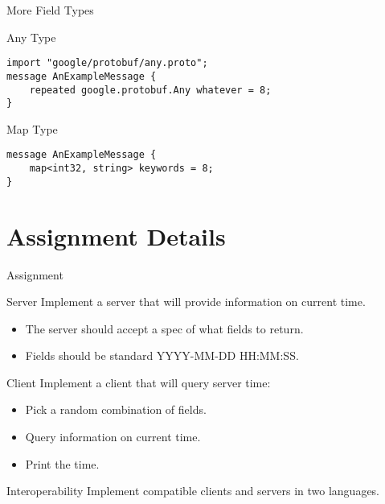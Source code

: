 \begin{frame}[fragile]{More Field Types}
    \begin{block}{Any Type}
\begin{lstlisting}[style=mini]
import "google/protobuf/any.proto";
message AnExampleMessage {
    repeated google.protobuf.Any whatever = 8;
}
\end{lstlisting}
    \end{block}

    \bigskip

    \begin{block}{Map Type}
\begin{lstlisting}[style=mini]
message AnExampleMessage {
    map<int32, string> keywords = 8;
}
\end{lstlisting}
    \end{block}
\end{frame}


\section{Assignment Details}


\begin{frame}{Assignment}
    \begin{block}{Server}
        Implement a server that will provide information on current time.
        \begin{itemize}
            \item The server should accept a spec of what fields to return.
            \item Fields should be standard YYYY-MM-DD HH:MM:SS.
        \end{itemize}
    \end{block}

    \begin{block}{Client}
        Implement a client that will query server time:
        \begin{itemize}
            \item Pick a random combination of fields.
            \item Query information on current time.
            \item Print the time.
        \end{itemize}
    \end{block}

    \begin{block}{Interoperability}
        Implement compatible clients and servers in two languages.
    \end{block}
\end{frame}



